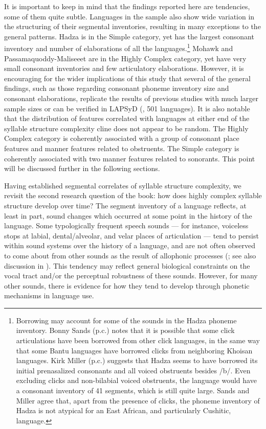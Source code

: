   It is important to keep in mind that the findings reported here are tendencies, some of them quite subtle. Languages in the sample also show wide variation in the structuring of their segmental inventories, resulting in many exceptions to the general patterns. Hadza is in the Simple category, yet has the largest consonant inventory and number of elaborations of all the languages.\footnote{ \textrm{Borrowing may account for some of the sounds in the Hadza phoneme inventory. Bonny Sands (p.c.) notes that it is possible that some click articulations have been borrowed from other click languages, in the same way that some Bantu languages have borrowed clicks from neighboring Khoisan languages. Kirk Miller (p.c.) suggests that Hadza seems to have borrowed its initial prenasalized consonants and all voiced obstruents besides /b/. Even excluding clicks and non-bilabial voiced obstruents, the language would have a consonant inventory of 41 segments, which is still quite large. Sands and Miller agree that, apart from the presence of clicks, the phoneme inventory of Hadza is not atypical for an East African, and particularly Cushitic, language.}} Mohawk and Passamaquoddy-Maliseeet are in the Highly Complex category, yet have very small consonant inventories and few articulatory elaborations. However, it is encouraging for the wider implications of this study that several of the general findings, such as those regarding consonant phoneme inventory size and consonant elaborations, replicate the results of previous studies with much larger sample sizes or can be verified in LAPSyD (\citealt{MaddiesonEtAl2013}, 501 languages). It is also notable that the distribution of features correlated with languages at either end of the syllable structure complexity cline does not appear to be random. The Highly Complex category is coherently associated with a group of consonant place features and manner features related to obstruents. The Simple category is coherently associated with two manner features related to sonorants. This point will be discussed further in the following sections.

  Having established segmental correlates of syllable structure complexity, we revisit the second research question of the book: how does highly complex syllable structure develop over time? The segment inventory of a language reflects, at least in part, sound changes which occurred at some point in the history of the language. Some typologically frequent speech sounds — for instance, voiceless stops at labial, dental/alveolar, and velar places of articulation — tend to persist within sound systems over the history of a language, and are not often observed to come about from other sounds as the result of allophonic processes (\citealt{Bybee2015a}; see also discussion in ). This tendency may reflect general biological constraints on the vocal tract and/or the perceptual robustness of these sounds. However, for many other sounds, there is evidence for how they tend to develop through phonetic mechanisms in language use. 

